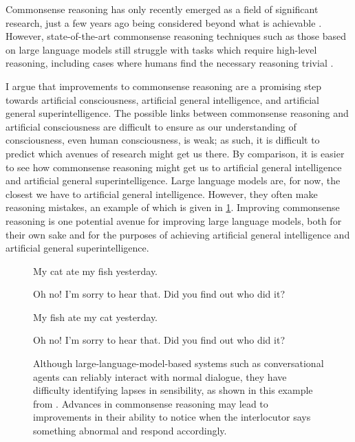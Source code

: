 \documentclass[12pt]{report}
\begin{document}
Commonsense reasoning has only recently emerged as a field of significant research, just a few years ago being considered beyond what is achievable \cite{Choi2022-to}.
However, state-of-the-art commonsense reasoning techniques such as those based on large language models still struggle with tasks which require high-level reasoning, including cases where humans find the necessary reasoning trivial \cite{Richardson2023-mq}.

I argue that improvements to commonsense reasoning are a promising step towards artificial consciousness, artificial general intelligence, and artificial general superintelligence.
The possible links between commonsense reasoning and artificial consciousness are difficult to ensure as our understanding of consciousness, even human consciousness, is weak; as such, it is difficult to predict which avenues of research might get us there.
By comparison, it is easier to see how commonsense reasoning might get us to artificial general intelligence and artificial general superintelligence.
Large language models are, for now, the closest we have to artificial general intelligence.
However, they often make reasoning mistakes, an example of which is given in \cref{fig:fish-ate-cat}.
Improving commonsense reasoning is one potential avenue for improving large language models, both for their own sake and for the purposes of achieving artificial general intelligence and artificial general superintelligence.

\begin{figure}
    \begin{minipage}{.5\textwidth}
        \begin{rightbubbles}
            My cat ate my fish yesterday.
        \end{rightbubbles}
        \begin{leftbubbles}
            Oh no!
            I'm sorry to hear that.
            Did you find out who did it?
        \end{leftbubbles}
    \end{minipage}
    \begin{minipage}{.5\textwidth}
        \begin{rightbubbles}
            My fish ate my cat yesterday.
        \end{rightbubbles}
        \begin{leftbubbles}
            Oh no!
            I'm sorry to hear that.
            Did you find out who did it?
        \end{leftbubbles}
    \end{minipage}
    \caption{
        Although large-language-model-based systems such as conversational agents can reliably interact with normal dialogue, they have difficulty identifying lapses in sensibility, as shown in this example from \cite{Richardson2023-mq}.
        Advances in commonsense reasoning may lead to improvements in their ability to notice when the interlocutor says something abnormal and respond accordingly.}
    \label{fig:fish-ate-cat}
\end{figure}
\end{document}
